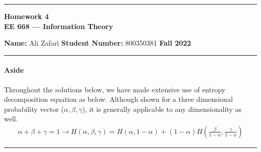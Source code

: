 \documentclass[12pt, letterpaper]{scrartcl}
\begin{document}
    \begin{center}
    	\hrule
    	\vspace{0.4cm}
    	{\textbf { {\large Homework 4} \\ EE 668 --- Information Theory}}
    \end{center}
    { \textbf{Name:} Ali Zafari \hspace{\fill} \textbf{Student Number:} 800350381 \hspace{\fill} \textbf{Fall 2022} } \newline\hrule
\paragraph*{Aside} \hfill\newline
Throughout the solutions below, we have made extensive use of entropy decomposition equation as below. Although shown for a three dimensional probability vector ($\alpha, \beta,\gamma$), it is generally applicable to any dimensionality as well.
\begin{align*}
    \alpha + \beta + \gamma = 1\longrightarrow
    H(\alpha, \beta, \gamma)=H(\alpha, 1-\alpha) + (1-\alpha)H(\frac{\beta}{1-\alpha}, \frac{\gamma}{1-\alpha})
\end{align*}
\hrule
\end{document}
